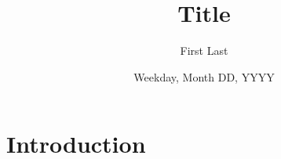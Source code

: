 \documentclass{article}
\title{Title}
\date{Weekday, Month DD, YYYY}
\author{First Last}
\begin{document}
\maketitle

\section{Introduction}

\lipsum[2-4]
\end{document}
